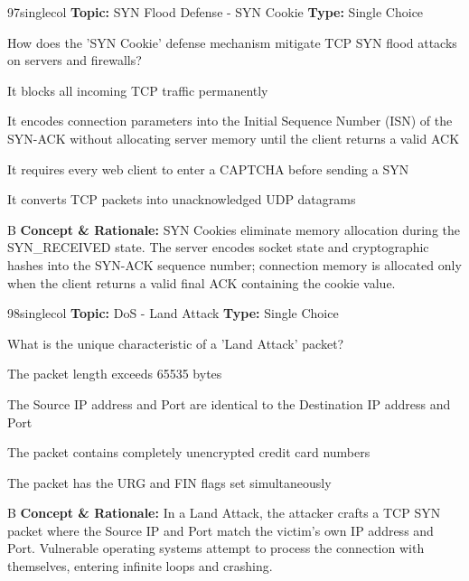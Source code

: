 \begin{qcard}{97}{singlecol}
\textcolor{darkslate!75}{\small\textbf{Topic:} SYN Flood Defense - SYN Cookie \hfill \textbf{Type:} Single Choice}\vspace{0.4em}\par
How does the 'SYN Cookie' defense mechanism mitigate TCP SYN flood attacks on servers and firewalls?
\begin{qoptions}
\item It blocks all incoming TCP traffic permanently
\item It encodes connection parameters into the Initial Sequence Number (ISN) of the SYN-ACK without allocating server memory until the client returns a valid ACK
\item It requires every web client to enter a CAPTCHA before sending a SYN
\item It converts TCP packets into unacknowledged UDP datagrams
\end{qoptions}
\end{qcard}
\nopagebreak
\begin{explainbox}{B}
\textbf{Concept \& Rationale:} SYN Cookies eliminate memory allocation during the SYN\_RECEIVED state. The server encodes socket state and cryptographic hashes into the SYN-ACK sequence number; connection memory is allocated only when the client returns a valid final ACK containing the cookie value.
\end{explainbox}

\begin{qcard}{98}{singlecol}
\textcolor{darkslate!75}{\small\textbf{Topic:} DoS - Land Attack \hfill \textbf{Type:} Single Choice}\vspace{0.4em}\par
What is the unique characteristic of a 'Land Attack' packet?
\begin{qoptions}
\item The packet length exceeds 65535 bytes
\item The Source IP address and Port are identical to the Destination IP address and Port
\item The packet contains completely unencrypted credit card numbers
\item The packet has the URG and FIN flags set simultaneously
\end{qoptions}
\end{qcard}
\nopagebreak
\begin{explainbox}{B}
\textbf{Concept \& Rationale:} In a Land Attack, the attacker crafts a TCP SYN packet where the Source IP and Port match the victim's own IP address and Port. Vulnerable operating systems attempt to process the connection with themselves, entering infinite loops and crashing.
\end{explainbox}

